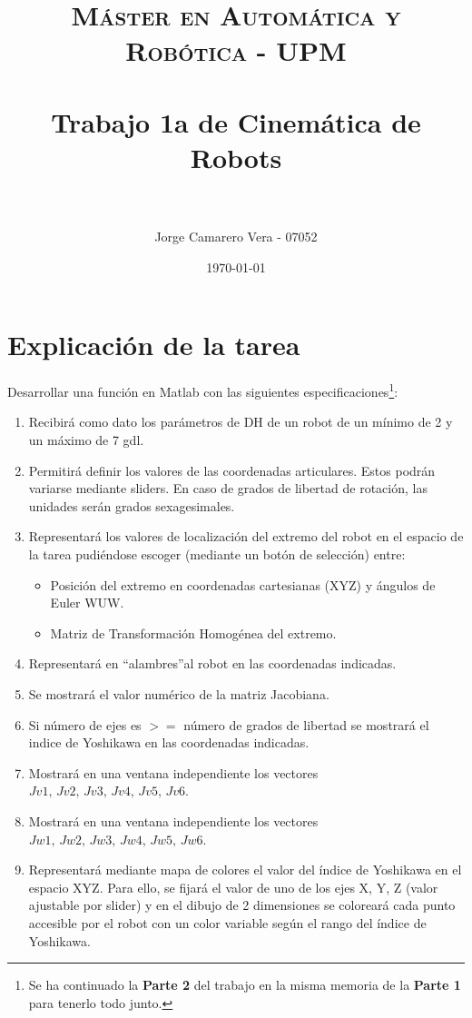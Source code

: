 \documentclass[a4paper, fontsize=11pt]{scrartcl} %
\title{	
	\normalfont \normalsize 
	\textsc{Máster en Automática y Robótica - UPM} \\ [25pt] %
	\horrule{0.5pt} \\[0.4cm] %
	\huge Trabajo 1a de Cinemática de Robots \\ %
	\horrule{2pt} \\[0.5cm] %
}
\author{Jorge Camarero Vera - 07052} %
\date{\normalsize\today} %
\numberwithin{equation}{section} %
\numberwithin{figure}{section} %
\numberwithin{table}{section} %
\begin{document}
	\maketitle
	
	\section{Explicación de la tarea}
	
	Desarrollar una función en Matlab con las siguientes especificaciones\footnote{Se ha continuado la \textbf{Parte 2} del trabajo en la misma memoria de la \textbf{Parte 1} para tenerlo todo junto.}:
	
	\begin{enumerate}
		\item Recibirá como dato los parámetros de DH de un robot de un mínimo de 2 y un máximo de 7 gdl.
		\item Permitirá definir los valores de las coordenadas articulares. Estos podrán variarse mediante sliders. En caso de grados de libertad de rotación, las unidades serán grados sexagesimales.
		\item Representará los valores de localización del extremo del robot en el espacio de la tarea pudiéndose escoger (mediante un botón de selección) entre:
		\begin{itemize}
			\item Posición del extremo en coordenadas cartesianas (XYZ) y ángulos de Euler WUW.
			\item Matriz de Transformación Homogénea del extremo.
		\end{itemize}
		\item Representará en \textquotedblleft alambres\textquotedblright al robot en las coordenadas indicadas.
		\item Se mostrará el valor numérico de la matriz Jacobiana.
		\item Si número de ejes es $>=$ número de grados de libertad se mostrará el indice de Yoshikawa en las coordenadas indicadas.
		\item Mostrará en una ventana independiente los vectores $Jv1,\,Jv2,\,Jv3,\,Jv4,\,Jv5,\,Jv6$.
		\item Mostrará en una ventana independiente los vectores $Jw1,\,Jw2,\,Jw3,\,Jw4,\,Jw5,\,Jw6$.
		\item  Representará mediante mapa de colores el valor del índice de Yoshikawa en el espacio XYZ. Para ello, se fijará el valor de uno de los ejes X, Y, Z (valor ajustable por slider) y en el dibujo de 2 dimensiones se coloreará cada punto accesible por el robot con un color variable según el rango del índice de Yoshikawa.
	\end{enumerate}
	
\end{document}
